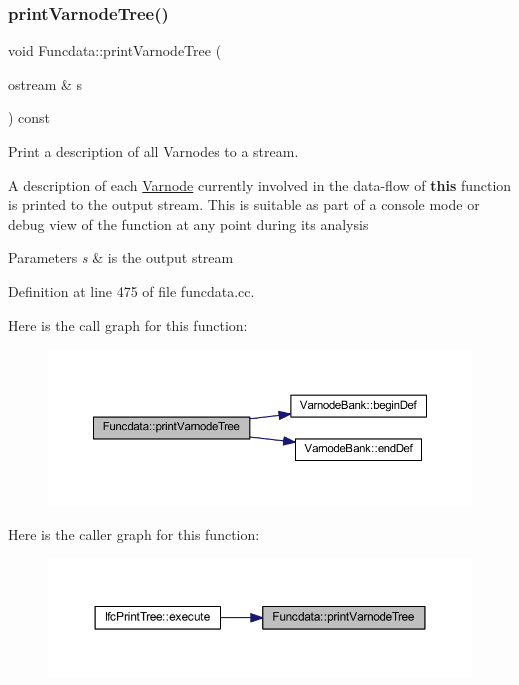 \subsubsection{\texorpdfstring{printVarnodeTree()}{printVarnodeTree()}}
{\footnotesize\ttfamily void Funcdata\+::print\+Varnode\+Tree (\begin{DoxyParamCaption}\item[{ostream \&}]{s }\end{DoxyParamCaption}) const}



Print a description of all Varnodes to a stream. 

A description of each \mbox{\hyperlink{class_varnode}{Varnode}} currently involved in the data-\/flow of {\bfseries{this}} function is printed to the output stream. This is suitable as part of a console mode or debug view of the function at any point during its analysis 
\begin{DoxyParams}{Parameters}
{\em s} & is the output stream \\
\hline
\end{DoxyParams}


Definition at line 475 of file funcdata.\+cc.

Here is the call graph for this function\+:
\nopagebreak
\begin{figure}[H]
\begin{center}
\leavevmode
\includegraphics[width=350pt]{class_funcdata_ac150948163b641a4d138ef82bf213f4e_cgraph}
\end{center}
\end{figure}
Here is the caller graph for this function\+:
\nopagebreak
\begin{figure}[H]
\begin{center}
\leavevmode
\includegraphics[width=350pt]{class_funcdata_ac150948163b641a4d138ef82bf213f4e_icgraph}
\end{center}
\end{figure}
\mbox{\label{class_funcdata_aa2d635570305e3ea710ade3cf090ba8c}} 
